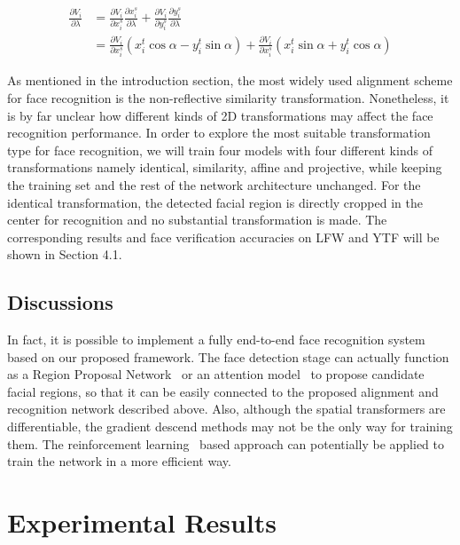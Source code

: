 \documentclass[10pt,twocolumn,letterpaper]{article}
\begin{document}
	\begin{equation}\label{eq_devlambda}
	\begin{split}
	\frac{\partial V_i}{\partial \lambda} &= \frac{\partial V_i}{\partial x_i^s} \frac{\partial x_i^s}{\partial \lambda} + \frac{\partial V_i}{\partial y_i^s} \frac{\partial y_i^s}{\partial \lambda} \\
	&= \frac{\partial V_i}{\partial x_i^s} (x_i^t \cos\alpha - y_i^t \sin\alpha) + \frac{\partial V_i}{\partial x_i^s} (x_i^t \sin\alpha + y_i^t \cos\alpha)
	\end{split}
	\end{equation}

	

As mentioned in the introduction section, the most widely used alignment scheme for face recognition is the non-reflective similarity transformation. 
Nonetheless, it is by far unclear how different kinds of 2D transformations may affect the face recognition performance.
In order to explore the most suitable transformation type for face recognition, we will train four models with four different kinds of transformations namely identical, similarity, affine and projective, while keeping the training set and the rest of the network architecture unchanged. 
For the identical transformation, the detected facial region is directly cropped in the center for recognition and no substantial transformation is made.
The corresponding results and face verification accuracies on LFW and YTF will be shown in Section 4.1.
	
\subsection{Discussions}

In fact, it is possible to implement a fully end-to-end face recognition system based on our proposed framework.
The face detection stage can actually function as a Region Proposal Network~\cite{Ren2016Faster} or an attention model~\cite{Xiao2015The} to propose candidate facial regions, so that it can be easily connected to the proposed alignment and recognition network described above.
Also, although the spatial transformers are differentiable, the gradient descend methods may not be the only way for training them. The reinforcement learning~\cite{Caicedo2015Active} based approach can potentially be applied to train the network in a more efficient way.

\section{Experimental Results}
\end{document}
